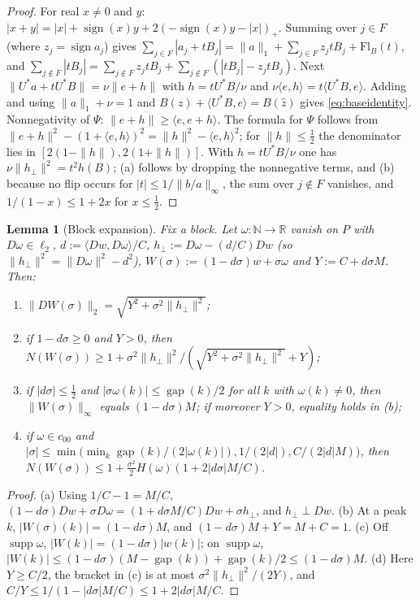 \documentclass[10pt]{amsart}
\newtheorem{lemma}[theorem]{Lemma}
\theoremstyle{definition}
\theoremstyle{remark}
\newcommand{\supp}{\operatorname{supp}}
\newcommand{\sgn}{\operatorname{sign}}
\newcommand{\R}{\mathbb R}
\newcommand{\N}{\mathbb N}
\newcommand{\gap}{\operatorname{gap}}
\newcommand{\zh}{\hat z}
\newcommand{\ip}[2]{\langle #1,#2\rangle}
\begin{document}
\begin{proof}
For real $x\ne0$ and $y$: $|x+y|=|x|+\sgn(x)y+2(-\sgn(x)y-|x|)_+$.  Summing
over $j\in F$ (where $z_j=\sgn a_j$) gives
$\sum_{j\in F}|a_j+tB_j|=\|a\|_1+\sum_{j\in F}z_jtB_j+\mathrm{Fl}_B(t)$,
and $\sum_{j\notin F}|tB_j|=\sum_{j\notin F}z_jtB_j+\sum_{j\notin
F}(|tB_j|-z_jtB_j)$.  Next $\|U^*a+tU^*B\|=\nu\|e+h\|$ with $h=tU^*B/\nu$
and $\nu\ip eh=t\ip{U^*B}{e}$.  Adding and using $\|a\|_1+\nu=1$ and
$B(z)+\ip{U^*B}{e}=B(\zh)$ gives \eqref{eq:baseidentity}.  Nonnegativity of
$\Psi$: $\|e+h\|\ge\ip{e}{e+h}$.  The formula for $\Psi$ follows from
$\|e+h\|^2-(1+\ip eh)^2=\|h\|^2-\ip eh^2$; for $\|h\|\le\frac12$ the
denominator lies in $[2(1-\|h\|),2(1+\|h\|)]$.  With $h=tU^*B/\nu$ one has
$\nu\|h_\perp\|^2=t^2h(B)$; (a) follows by dropping the nonnegative terms,
and (b) because no flip occurs for $|t|\le1/\|b/a\|_\infty$, the sum over
$j\notin F$ vanishes, and $1/(1-x)\le1+2x$ for $x\le\frac12$.
\end{proof}

\begin{lemma}[Block expansion]\label{lem:block}
Fix a block.  Let $\omega:\N\to\R$ vanish on $P$ with $D\omega\in\ell_2$,
$d:=\ip{Dw}{D\omega}/C$, $h_\perp:=D\omega-(d/C)Dw$ \textup{(}so
$\|h_\perp\|^2=\|D\omega\|^2-d^2$\textup{)}, $W(\sigma):=(1-d\sigma)w+
\sigma\omega$ and $Y:=C+d\sigma M$.  Then:
\begin{enumerate}
\item[(a)] $\|DW(\sigma)\|_2=\sqrt{Y^2+\sigma^2\|h_\perp\|^2}$;
\item[(b)] if $1-d\sigma\ge0$ and $Y>0$, then
$N(W(\sigma))\ge1+\sigma^2\|h_\perp\|^2/(\sqrt{Y^2+\sigma^2\|h_\perp\|^2}+Y)$;
\item[(c)] if $|d\sigma|\le\frac12$ and $|\sigma\omega(k)|\le\gap(k)/2$ for
all $k$ with $\omega(k)\ne0$, then $\|W(\sigma)\|_\infty$ equals
$(1-d\sigma)M$; if moreover $Y>0$, equality holds in \textup{(b)};
\item[(d)] if $\omega\in c_{00}$ and $|\sigma|\le\min\big(\min_{k}
\gap(k)/(2|\omega(k)|),1/(2|d|),C/(2|d|M)\big)$, then
$N(W(\sigma))\le1+\frac{\sigma^2}2H(\omega)(1+2|d\sigma|M/C)$.
\end{enumerate}
\end{lemma}

\begin{proof}
(a) Using $1/C-1=M/C$, $(1-d\sigma)Dw+\sigma D\omega=(1+d\sigma M/C)Dw
+\sigma h_\perp$, and $h_\perp\perp Dw$.  (b) At a peak $k$,
$|W(\sigma)(k)|=(1-d\sigma)M$, and $(1-d\sigma)M+Y=M+C=1$.  (c) Off
$\supp\omega$, $|W(k)|=(1-d\sigma)|w(k)|$; on $\supp\omega$,
$|W(k)|\le(1-d\sigma)(M-\gap(k))+\gap(k)/2\le(1-d\sigma)M$.  (d) Here $Y\ge
C/2$, the bracket in (c) is at most $\sigma^2\|h_\perp\|^2/(2Y)$, and
$C/Y\le1/(1-|d\sigma|M/C)\le1+2|d\sigma|M/C$.
\end{proof}
\end{document}
